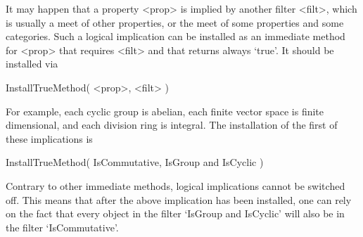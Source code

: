 
It may happen that a property <prop> is implied by another filter <filt>,
which is usually a meet of other properties,
or the meet of some properties and some categories.
Such a logical implication can be installed as an immediate method for
<prop> that requires <filt> and that returns always `true'.
It should be installed via

\>InstallTrueMethod( <prop>, <filt> )

For example, each cyclic group is abelian,
each finite vector space is finite dimensional,
and each division ring is integral.
The installation of the first of these implications is

\>InstallTrueMethod( IsCommutative, IsGroup and IsCyclic )

Contrary to other immediate methods,
logical implications cannot be switched off.
This means that after the above implication has been installed,
one can rely on the fact that every object in the filter
`IsGroup and IsCyclic' will also be in the filter `IsCommutative'.


